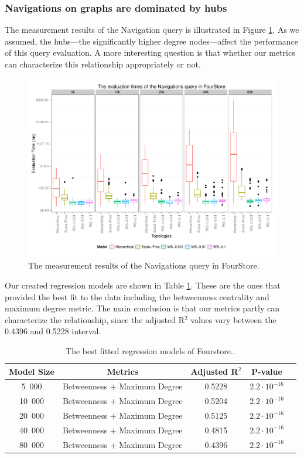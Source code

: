 \subsubsection{Navigations on graphs are dominated by hubs}

The measurement results of the Navigation query is illustrated in Figure \ref{fig:fourstore_q2}. As we assumed, the hubs---\ie the significantly higher degree nodes---affect the performance of this query evaluation. A more interesting question is that whether our metrics can characterize this relationship appropriately or not. 

\begin{figure}[!ht]
	\centering
	\includegraphics[width=160mm, keepaspectratio]{figures/4store_q2.pdf}
	\caption{The measurement results of the Navigations query in FourStore.}
	\label{fig:fourstore_q2}
\end{figure}

Our created regression models are shown in Table \ref{tab:regressions_4store_q2}. These are the ones that provided the best fit to the data including the betweenness centrality and maximum degree metric. The main conclusion is that our metrics partly can characterize the relationship, since the adjusted R$^2$ values vary between the 0.4396 and 0.5228 interval.
\begin{table}[ht]
	\footnotesize
	\centering
	\begin{tabular}{ c c c c c}
		\toprule
		Model Size & Metrics & Adjusted R$^2$ &  P-value\\ \hline
		5~000 & Betweenness + Maximum Degree & 0.5228 & $2.2 \cdot 10^{-16}$ \\ 
		10~000 & Betweenness + Maximum Degree & 0.5204 & $2.2 \cdot 10^{-16}$ \\ 
		20~000 & Betweenness + Maximum Degree & 0.5125 & $2.2 \cdot 10^{-16}$\\ 
		40~000 & Betweenness + Maximum Degree & 0.4815 & $2.2\cdot 10^{-16}$ \\  
		80~000 & Betweenness + Maximum Degree & 0.4396 & $2.2\cdot 10^{-16}$ \\  
		\bottomrule
	\end{tabular}
	\caption{The best fitted regression models of Fourstore..}
	\label{tab:regressions_4store_q2}
\end{table}

